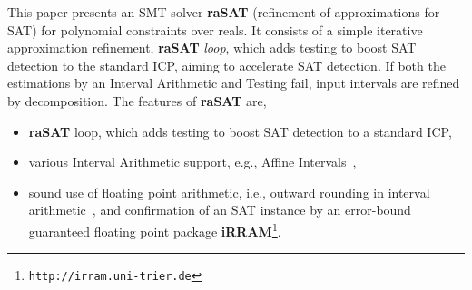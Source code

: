 \documentclass[runningheads,a4paper,oribibl]{llncs}
\begin{document}
This paper presents an SMT solver {\bf raSAT} (refinement of approximations for SAT) for polynomial constraints over reals. 
It consists of a simple iterative approximation refinement, {\bf raSAT} {\em loop}, 
which adds testing to boost SAT detection to the standard ICP, 
aiming to accelerate SAT detection. 
If both the estimations by an Interval Arithmetic and Testing fail, input intervals are refined by decomposition. 
%
The features of {\bf raSAT} are, 
\begin{itemize}
\item {\bf raSAT} loop, which adds testing to boost SAT detection to a standard ICP, 
\item various Interval Arithmetic support, e.g., 
Affine Intervals~\cite{Messine_extensionsof,Ngoc:2009:ORE:1685167.1685421,VanKhanh201227}, 
\item sound use of floating point arithmetic, i.e., 
outward rounding in interval arithmetic~\cite{Hickey:2001:IAP:502102.502106}, 
and confirmation of an SAT instance by an error-bound guaranteed floating point package {\bf iRRAM}\footnote{%
\tt http://irram.uni-trier.de}. 
\end{itemize}
\end{document}
